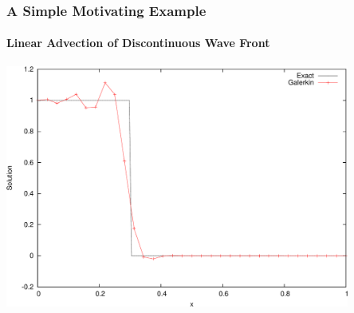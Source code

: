 \begin{frame}
\frametitle{A Simple Motivating Example}
\framesubtitle{Linear Advection of Discontinuous Wave Front}

\begin{center}
\includegraphics[width=0.85\textwidth]{./figures/advection_Galerkin.pdf}
\end{center}

\end{frame}
